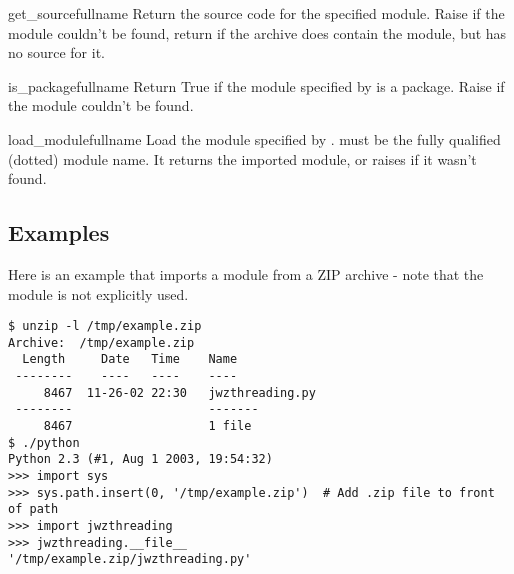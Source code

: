 \begin{methoddesc}{get_source}{fullname}
  Return the source code for the specified module. Raise
   if the module couldn't be found, return
   if the archive does contain the module, but has
  no source for it.
\end{methoddesc}

\begin{methoddesc}{is_package}{fullname}
  Return True if the module specified by  is a package.
  Raise  if the module couldn't be found.
\end{methoddesc}

\begin{methoddesc}{load_module}{fullname}
  Load the module specified by .  must be the
  fully qualified (dotted) module name. It returns the imported
  module, or raises  if it wasn't found.
\end{methoddesc}

\subsection{Examples}

Here is an example that imports a module from a ZIP archive - note that
the  module is not explicitly used.

\begin{verbatim}
$ unzip -l /tmp/example.zip
Archive:  /tmp/example.zip
  Length     Date   Time    Name
 --------    ----   ----    ----
     8467  11-26-02 22:30   jwzthreading.py
 --------                   -------
     8467                   1 file
$ ./python
Python 2.3 (#1, Aug 1 2003, 19:54:32) 
>>> import sys
>>> sys.path.insert(0, '/tmp/example.zip')  # Add .zip file to front of path
>>> import jwzthreading
>>> jwzthreading.__file__
'/tmp/example.zip/jwzthreading.py'
\end{verbatim}
